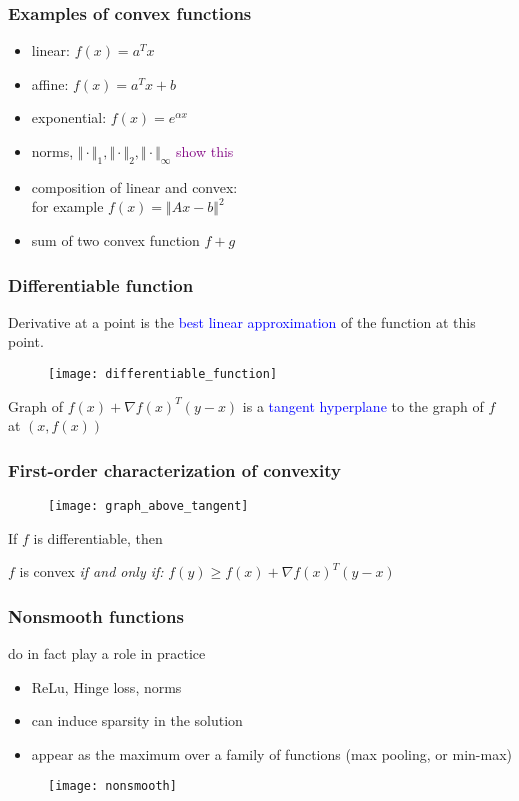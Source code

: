 \documentclass{beamer}
\begin{document}
\begin{frame}
  \frametitle{Examples of convex functions}
  \begin{itemize}
    \item linear: $f(x) = a^T x$
    \item affine: $f(x) = a^T x + b$
    \item exponential: $f(x) = e^{\alpha x}$
    \item norms, $\Vert \cdot \Vert_1, \Vert \cdot \Vert_2, \Vert \cdot \Vert_\infty$ \hfill \textcolor{purple}{show this}
    \item composition of linear and convex: \\
          for example $f(x)=\Vert Ax-b  \Vert^2$
    \item sum of two convex function $f+g$
  \end{itemize}

\end{frame}


\begin{frame}
  \frametitle{Differentiable function}
  Derivative at a point is the \textcolor{blue}{best linear approximation} of the function at this point.
  \begin{figure}[ht]
    \centering
    \texttt{[image: differentiable\_function]}
  \end{figure}
  \begin{center}
    Graph of $f(x)+ {\nabla f(x)}^T (y-x)$ is a \textcolor{blue}{tangent hyperplane} to the graph of $f$ at $(x,f(x))$
  \end{center}
\end{frame}


\begin{frame}
  \frametitle{First-order characterization of convexity}

  \begin{figure}[ht]
    \centering
    \texttt{[image: graph\_above\_tangent]}
  \end{figure}
  If $f$ is differentiable, then
  \begin{center}
    $f$ is convex \emph{if and only if:} $f(y) \ge f(x) + {\nabla f(x)}^T (y-x)$
  \end{center}
\end{frame}


\begin{frame}
  \frametitle{Nonsmooth functions }
  do in fact play a role in practice
  \begin{itemize}
    \item ReLu, Hinge loss, norms
    \item can induce sparsity in the solution
    \item appear as the maximum over a family of functions (max pooling, or min-max)
  \end{itemize}
  \begin{figure}[ht]
    \centering
    \texttt{[image: nonsmooth]}
  \end{figure}


\end{frame}
\end{document}
